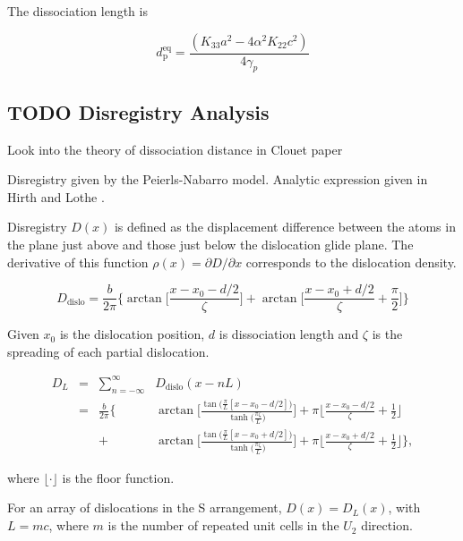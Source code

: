 \documentclass[11pt]{article}
\begin{document}
The dissociation length is 

\[
    d_{\text{p}}^{\text{eq}} = \frac{ ( K_{33}a^2 - 4 \alpha^2 K_{22} c^2 ) }{ 4 \gamma_{p} }
    \]


\subsection{{\bfseries\sffamily TODO} Disregistry Analysis}
\label{sec:org216bc17}
Look into the theory of dissociation distance in Clouet paper
\cite{Clouet2012}


Disregistry given by the Peierls-Nabarro model. Analytic
expression given in Hirth and Lothe \cite{anderson2017theory}.

Disregistry \(D(x)\) is defined as the displacement difference
between the atoms in the plane just above and those just below the
dislocation glide plane. The derivative of this function \(\rho(x) = \partial
    D / \partial x\) corresponds to the dislocation density.


\[
    D_{\text{dislo}} = \frac{b}{2\pi} 
    \Bigg\{ \arctan \bigg[  \frac{x - x_0 - d/2}{ \zeta } \bigg] +
           \arctan \bigg[  \frac{x - x_0 + d/2}{ \zeta } + \frac{\pi}{2} \bigg]
	   \Bigg\}
    \]

Given \(x_0\) is the dislocation position, \(d\) is dissociation
length and \(\zeta\) is the spreading of each partial dislocation. 

\begin{align*}
  D_{L} &= &\sum_{n = -\infty}^{\infty}  &D_{\text{dislo}} (x - nL) \\
     &= &\frac{ b }{ 2\pi } 
        \Bigg \{ 
         &\arctan \bigg[ 
            \frac{ 
                  \tan \big( \frac{\pi}{L} [x - x_0 - d/2] \big)
                 }{ 
                 \tanh \big( \frac{\pi\zeta}{L} \big)
                  } \bigg]
       + \pi\bigg\lfloor 
       	 \frac{x - x_0 - d/2}{ \zeta } + \frac{1}{2}
       \bigg\rfloor \\
   & &+
         &\arctan \bigg[ 
            \frac{ 
                  \tan \big( \frac{\pi}{L} [x - x_0 + d/2] \big)
                 }{ 
                 \tanh \big( \frac{\pi\zeta}{L} \big)
                  } \bigg]
       + \pi \bigg\lfloor 
       	 \frac{x - x_0 + d/2}{ \zeta } + \frac{1}{2}
       \bigg\rfloor    \Bigg\},
\end{align*}

where \(\lfloor \cdot \rfloor\) is the floor function. 

For an array of dislocations in the S arrangement, \(D(x) = D_L(x)\),
with \(L = mc\), where \(m\) is the number of repeated unit cells in
the \(U_2\) direction. 
\end{document}
